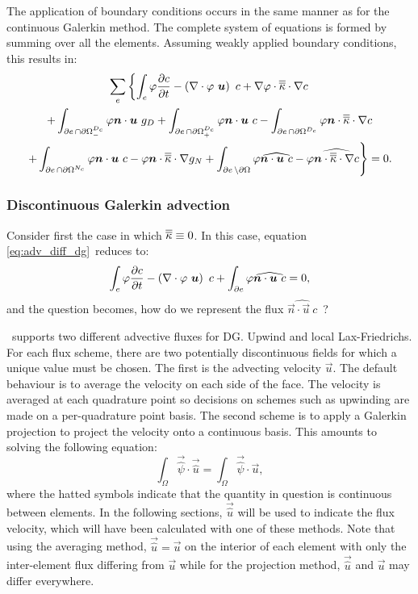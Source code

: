 The application of boundary conditions occurs in the same manner as for the
continuous Galerkin method. The complete system of equations is formed
by summing over all the elements. Assuming weakly applied boundary
conditions, this results in:
\begin{multline}
  \sum_e \left\{ \int_e \varphi \frac{\partial c}{\partial t}
  - \left(\nabla\cdot \varphi~{\mbox{\boldmath$u$}}\right)~c
  + \nabla\varphi\cdot\overline{\overline{\kappa}}\cdot\nabla c \right. \\
  \left. + \int_{\partial e\,\cap{\partial\Omega}^{D_c}_{-}} \varphi{\mbox{\boldmath$n$}}\cdot{\mbox{\boldmath$u$}}~g_D
  + \int_{\partial e\,\cap{\partial\Omega}^{D_c}_{+}} \varphi{\mbox{\boldmath$n$}}\cdot{\mbox{\boldmath$u$}}~c
  - \int_{\partial e\,\cap{\partial\Omega}^{D_c}}
  \varphi{\mbox{\boldmath$n$}}\cdot\overline{\overline{\kappa}}\cdot\nabla c \right. \\
  \left. + \int_{\partial e\,\cap{\partial\Omega}^{N_c}} \varphi{\mbox{\boldmath$n$}}\cdot{\mbox{\boldmath$u$}}~c
  - \varphi{\mbox{\boldmath$n$}}\cdot\overline{\overline{\kappa}}\cdot\nabla g_N + \int_{\partial e\,\setminus{\partial\Omega}} \varphi\widehat{{\mbox{\boldmath$n$}}\cdot{\mbox{\boldmath$u$}}~c}
  - \varphi\widehat{{\mbox{\boldmath$n$}}\cdot\overline{\overline{\kappa}}\cdot\nabla c} \right\}
    = 0.
\end{multline}

\subsubsection{Discontinuous Galerkin advection}
\label{sec:ND_discontinuous_galerkin_advection}

Consider first the case in which $\overline{\overline{\kappa}}\equiv 0$. In this case, equation
\eqref{eq:adv_diff_dg}\ reduces to:
\begin{equation}\label{eq:adv_dg}
  \int_e \varphi \frac{\partial c}{\partial t} -
    \left(\nabla\cdot \varphi~{\mbox{\boldmath$u$}}\right)~c +
    \int_{\partial e} \varphi\widehat{{\mbox{\boldmath$n$}}\cdot{\mbox{\boldmath$u$}}~c}
    = 0,
\end{equation}
and the question becomes, how do we represent the flux
$\widehat{\vec{n}\cdot\vec{u}~c}$\ ?

\fluidity\ supports two different advective fluxes for DG. Upwind and local
Lax-Friedrichs. For each flux scheme, there are two potentially
discontinuous fields for which a unique value must be chosen. The first is
the advecting velocity $\vec{u}$. The default behaviour is to average the
velocity on each side of the face. The velocity is averaged at each
quadrature point so decisions on schemes such as upwinding are made on a
per-quadrature point basis. The second scheme is to apply a Galerkin
projection to project the velocity onto a continuous basis. This amounts to
solving the following equation:
\begin{equation}
  \int_\Omega \vec{\hat{\psi}} \cdot\vec{\hat{u}}
  = \int_\Omega \vec{\hat{\psi}}\cdot \vec{u},
\end{equation}
where the hatted symbols indicate that the quantity in question is
continuous between elements. In the following sections, $\vec{\hat{u}}$ will
be used to indicate the flux velocity, which will have been calculated with
one of these methods. Note that using the averaging method,
$\vec{\hat{u}}=\vec{u}$ on the interior of each element with only the inter-element
flux differing from $\vec{u}$ while for the projection method, $\vec{\hat
  u}$ and $\vec{u}$ may differ everywhere.

